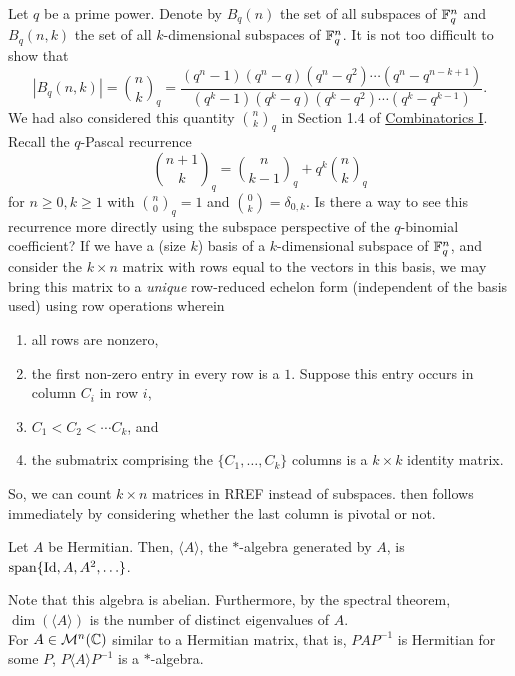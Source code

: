 	Let $q$ be a prime power. Denote by $B_q(n)$ the set of all subspaces of $\mathbb{F}_q^n$ and $B_q(n,k)$ the set of all $k$-dimensional subspaces of $\mathbb{F}_q^n$. It is not too difficult to show that
	\[ |B_q(n,k)| = \binom{n}{k}_q = \frac{(q^n-1)(q^n-q)(q^n-q^2)\cdots(q^n-q^{n-k+1})}{(q^k-1)(q^k-q)(q^k-q^2)\cdots(q^k-q^{k-1})}. \]
	We had also considered this quantity $\binom{n}{k}_q$ in Section 1.4 of \href{https://amitrajaraman.github.io/notes/ma-861/main.pdf}{Combinatorics I}. Recall the $q$-Pascal recurrence
	\begin{equation}
		\label{eqn: q-pascal}
		\binom{n+1}{k}_q = \binom{n}{k-1}_q + q^k \binom{n}{k}_q
	\end{equation}
	for $n\ge 0, k \ge 1$ with $\binom{n}{0}_q = 1$ and $\binom{0}{k} = \delta_{0,k}$. Is there a way to see this recurrence more directly using the subspace perspective of the $q$-binomial coefficient? If we have a (size $k$) basis of a $k$-dimensional subspace of $\mathbb{F}_q^n$, and consider the $k \times n$ matrix with rows equal to the vectors in this basis, we may bring this matrix to a \emph{unique} row-reduced echelon form (independent of the basis used) using row operations wherein
	\begin{enumerate}[label=(\roman*)]
		\item all rows are nonzero,
		\item the first non-zero entry in every row is a $1$. Suppose this entry occurs in column $C_i$ in row $i$,
		\item $C_1 < C_2 < \cdots C_k$, and
		\item the submatrix comprising the $\{C_1,\ldots,C_k\}$ columns is a $k \times k$ identity matrix.
	\end{enumerate}
	So, we can count $k \times n$ matrices in RREF instead of subspaces.  then follows immediately by considering whether the last column is pivotal or not.

	\begin{fdef}
		Let $A$ be Hermitian. Then, $\langle A\rangle$, the $*$-algebra generated by $A$, is $\operatorname{span}\{\operatorname{Id},A,A^2,\ldots\}$.
	\end{fdef}

	Note that this algebra is abelian. Furthermore, by the spectral theorem, $\dim(\langle A\rangle)$ is the number of distinct eigenvalues of $A$.\\ %

	For $A \in \mathcal{M}^n(\mathbb{C})$ similar to a Hermitian matrix, that is, $PAP^{-1}$ is Hermitian for some $P$, $P\langle A\rangle P^{-1}$ is a $*$-algebra.
	
